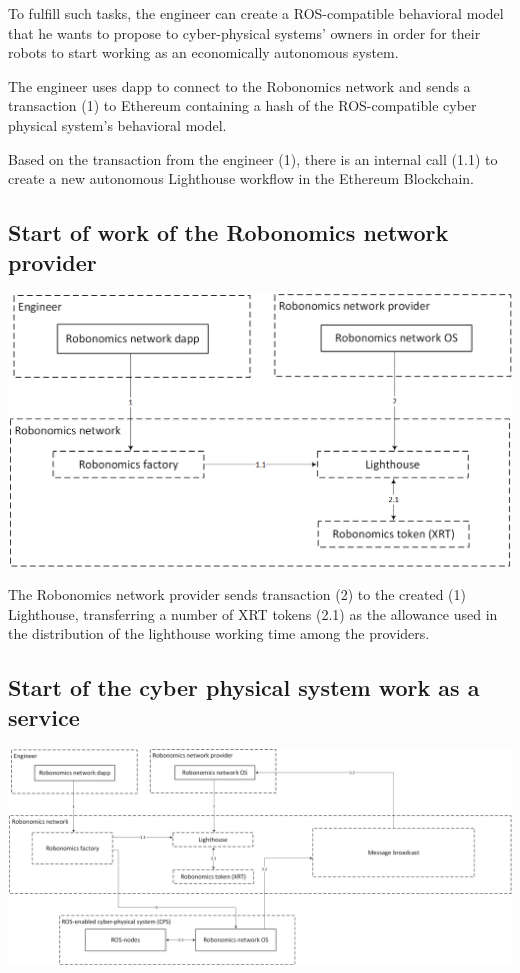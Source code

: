 \documentclass{article}
\begin{document}
To fulfill such tasks, the engineer can create a ROS-compatible behavioral model that he wants to propose to cyber-physical systems' owners in order for their robots to start working as an economically autonomous system.

The engineer uses dapp to connect to the Robonomics network and sends a transaction (1) to Ethereum containing a hash of the ROS-compatible cyber physical system's behavioral model.

Based on the transaction from the engineer (1), there is an internal call (1.1) to create a new autonomous Lighthouse workflow in the Ethereum Blockchain.

\subsection{Start of work of the Robonomics network provider}

\includegraphics[width=1\textwidth]{step-by-step-2.png}

The Robonomics network provider sends transaction (2) to the created (1) Lighthouse, transferring a number of XRT tokens (2.1) as the allowance used in the distribution of the lighthouse working time among the providers.

\subsection{Start of the cyber physical system work as a service}

\includegraphics[width=1\textwidth]{step-by-step-3.png}
\end{document}
